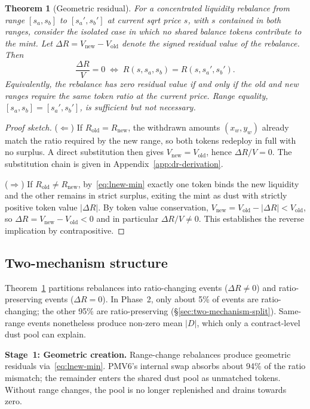 \documentclass[11pt,a4paper]{article}
\theoremstyle{plain}
\newtheorem{theorem}{Theorem}
\begin{document}
\begin{theorem}[Geometric residual]\label{thm:residual}
For a concentrated liquidity rebalance from range $[s_a, s_b]$ to $[s_a', s_b']$ at current sqrt price $s$, with $s$ contained in both ranges, consider the isolated case in which no shared balance tokens contribute to the mint. Let $\Delta R = V_{\text{new}} - V_{\text{old}}$ denote the signed residual value of the rebalance. Then
\[
\frac{\Delta R}{V} = 0 \;\iff\; R(s, s_a, s_b) = R(s, s_a', s_b').
\]
Equivalently, the rebalance has zero residual value if and only if the old and new ranges require the same token ratio at the current price. Range equality, $[s_a, s_b] = [s_a', s_b']$, is sufficient but not necessary.
\end{theorem}

\begin{proof}[Proof sketch]
($\Leftarrow$) If $R_{\text{old}} = R_{\text{new}}$, the withdrawn amounts $(x_w, y_w)$ already match the ratio required by the new range, so both tokens redeploy in full with no surplus. A direct substitution then gives $V_{\text{new}} = V_{\text{old}}$, hence $\Delta R/V = 0$. The substitution chain is given in Appendix~\ref{app:dr-derivation}.

($\Rightarrow$) If $R_{\text{old}} \neq R_{\text{new}}$, by~\eqref{eq:lnew-min} exactly one token binds the new liquidity and the other remains in strict surplus, exiting the mint as dust with strictly positive token value $|\Delta R|$. By token value conservation, $V_{\text{new}} = V_{\text{old}} - |\Delta R| < V_{\text{old}}$, so $\Delta R = V_{\text{new}} - V_{\text{old}} < 0$ and in particular $\Delta R/V \neq 0$. This establishes the reverse implication by contrapositive.
\end{proof}

\subsection{Two-mechanism structure}\label{sec:two-mechanism}

Theorem~\ref{thm:residual} partitions rebalances into ratio-changing events ($\Delta R \neq 0$) and ratio-preserving events ($\Delta R = 0$). In Phase~2, only about 5\% of events are ratio-changing; the other 95\% are ratio-preserving (\S\ref{sec:two-mechanism-split}). Same-range events nonetheless produce non-zero mean $|D|$, which only a contract-level dust pool can explain.

\textbf{Stage~1: Geometric creation.} Range-change rebalances produce geometric residuals via~\eqref{eq:lnew-min}. PMV6's internal swap absorbs about 94\% of the ratio mismatch; the remainder enters the shared dust pool as unmatched tokens. Without range changes, the pool is no longer replenished and drains towards zero.
\end{document}
